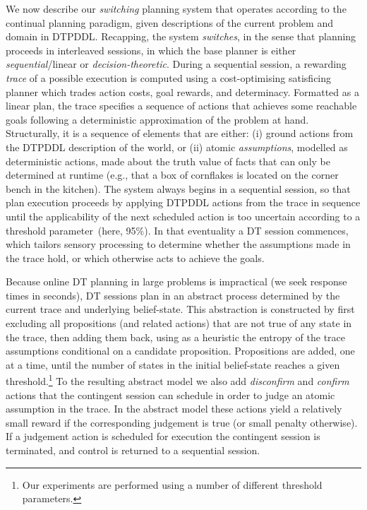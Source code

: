 
We now describe our {\em switching} planning system that operates
according to the continual planning paradigm, given descriptions of
the current problem and domain in DTPDDL. Recapping, the system {\em
switches}, in the sense that planning proceeds in interleaved
sessions, in which the base planner is either {\em sequential}/linear
or {\em decision-theoretic}.
During a sequential session, a rewarding {\em trace} of a possible
execution is computed using a cost-optimising satisficing planner
which trades action costs, goal rewards, and determinacy.
Formatted as a linear plan, the trace specifies a sequence of actions
that achieves some reachable goals following a deterministic
approximation of the problem at hand.
Structurally, it is a sequence of elements that are either: (i) ground
actions from the DTPDDL description of the world, or (ii) atomic {\em
assumptions}, modelled as deterministic actions, made about the truth
value of facts that can only be determined at runtime (e.g., that a
box of cornflakes is located on the corner bench in the kitchen).
The system always begins in a sequential session, so that plan
execution proceeds by applying DTPDDL actions from the trace in
sequence until the applicability of the next scheduled action is too
uncertain according to a threshold parameter~(here, 95\%). In that
eventuality a DT session commences, which tailors sensory processing
to determine whether the assumptions made in the trace hold, or which
otherwise acts to achieve the goals. 


Because online DT planning in large problems is impractical (we seek
response times in seconds), DT sessions plan in an abstract process
determined by the current trace and underlying belief-state. This
abstraction is constructed by first excluding all propositions (and
related actions) that are not true of any state in the trace, then
adding them back, using as a heuristic the entropy of the trace
assumptions conditional on a candidate proposition. Propositions are
added, one at a time, until the number of states in the initial
belief-state reaches a given threshold.\footnote{Our experiments are
performed using a number of different threshold parameters.}  To the
resulting abstract model we also add {\em disconfirm} and {\em
confirm} actions that the contingent session can schedule in order to
judge an atomic assumption in the trace. In the abstract model these
actions yield a relatively small reward if the corresponding judgement
is true (or small penalty otherwise). If a judgement action is
scheduled for execution the contingent session is terminated, and
control is returned to a sequential session.



